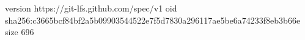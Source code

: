 version https://git-lfs.github.com/spec/v1
oid sha256:c3665bcf84bf2a5b09903544522e7f5d7830a296117ae5be6a74233f8eb3b66e
size 696
